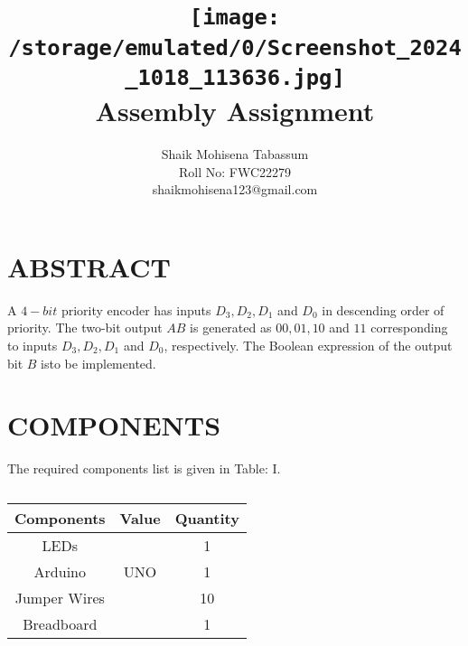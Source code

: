 \documentclass[conference]{IEEEtran}
\title{
\vspace{1cm}
{\texttt{[image: /storage/emulated/0/Screenshot\_2024\_1018\_113636.jpg]} \\ Assembly Assignment} }
\author{Shaik Mohisena Tabassum \\ Roll No: FWC22279 \\ shaikmohisena123@gmail.com}
\begin{document}
\maketitle
 \section {ABSTRACT}
 A $4-bit$ priority encoder has inputs $D_3, D_2, D_1$ and $D_0$ in descending order of priority. The two-bit output $AB$ is generated as $00, 01, 10$ and $11$ corresponding to inputs $D_3, D_2, D_1$ and $D_0$, respectively. The Boolean expression of the output bit $B$ isto be implemented.
\section{COMPONENTS}
The required components list is given in Table: I. 
 \begin{table} [htbp]
\centering
\begin{tabular}{| c | c | c |} \hline
Components & Value & Quantity \\\hline
LEDs &  & 1 \\ \hline
Arduino & UNO & 1 \\ \hline
Jumper Wires &  & 10 \\ \hline
Breadboard & & 1 \\ 
\hline
\end{tabular}
\vspace{0.1cm}
\caption{\label{tab:widgets}}
\end{table}
\end{document}
